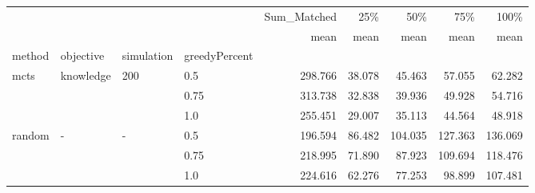 \begin{tabular}{llllrrrrr}
\toprule
       &   &   &     & Sum\_Matched &    25\% &     50\% &     75\% &    100\% \\
       &   &   &     &        mean &   mean &    mean &    mean &    mean \\
method & objective & simulation & greedyPercent &             &        &         &         &         \\
\midrule
mcts & knowledge & 200 & 0.5 &     298.766 & 38.078 &  45.463 &  57.055 &  62.282 \\
       &   &   & 0.75 &     313.738 & 32.838 &  39.936 &  49.928 &  54.716 \\
       &   &   & 1.0 &     255.451 & 29.007 &  35.113 &  44.564 &  48.918 \\
random & - & - & 0.5 &     196.594 & 86.482 & 104.035 & 127.363 & 136.069 \\
       &   &   & 0.75 &     218.995 & 71.890 &  87.923 & 109.694 & 118.476 \\
       &   &   & 1.0 &     224.616 & 62.276 &  77.253 &  98.899 & 107.481 \\
\bottomrule
\end{tabular}
